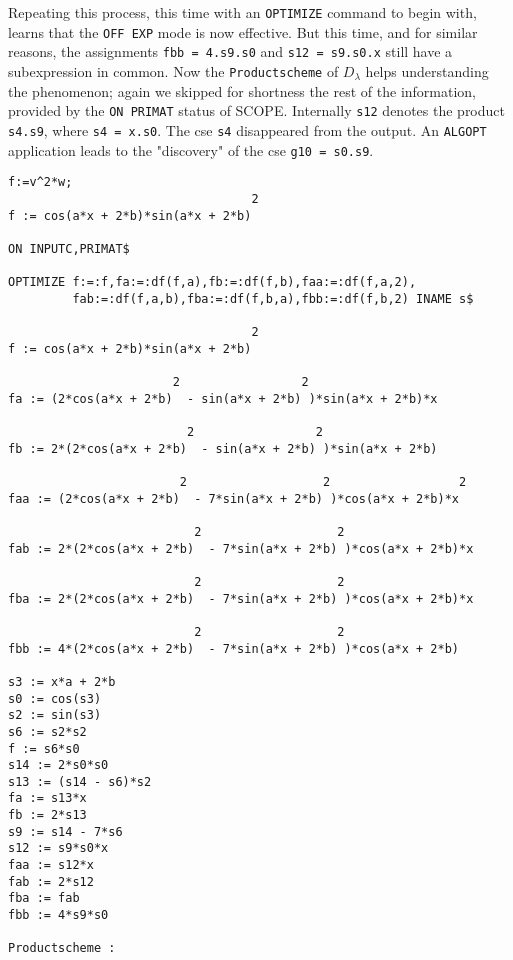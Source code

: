 Repeating this process, this time with an {\tt OPTIMIZE} command to begin with,
learns that the {\tt OFF EXP} mode is now effective. But this time, and for 
similar
reasons, the assignments {\tt fbb = 4.s9.s0} and {\tt s12 = s9.s0.x} still
have a subexpression in common. Now the \verb+Productscheme+ of $D_{\lambda}$ 
helps understanding the phenomenon; again we skipped for shortness the rest of
the information, provided by the {\tt ON PRIMAT} status of SCOPE.
Internally {\tt s12} denotes the product {\tt s4.s9},
where {\tt s4 = x.s0}. The cse {\tt s4} disappeared from the output. 
An {\tt ALGOPT} application leads to the "discovery" of the 
cse {\tt g10 = s0.s9}.
{\small
\begin{verbatim}
f:=v^2*w;
                                  2
f := cos(a*x + 2*b)*sin(a*x + 2*b)

ON INPUTC,PRIMAT$

OPTIMIZE f:=:f,fa:=:df(f,a),fb:=:df(f,b),faa:=:df(f,a,2),
         fab:=:df(f,a,b),fba:=:df(f,b,a),fbb:=:df(f,b,2) INAME s$

                                  2
f := cos(a*x + 2*b)*sin(a*x + 2*b)

                       2                 2
fa := (2*cos(a*x + 2*b)  - sin(a*x + 2*b) )*sin(a*x + 2*b)*x

                         2                 2
fb := 2*(2*cos(a*x + 2*b)  - sin(a*x + 2*b) )*sin(a*x + 2*b)

                        2                   2                  2
faa := (2*cos(a*x + 2*b)  - 7*sin(a*x + 2*b) )*cos(a*x + 2*b)*x

                          2                   2
fab := 2*(2*cos(a*x + 2*b)  - 7*sin(a*x + 2*b) )*cos(a*x + 2*b)*x

                          2                   2
fba := 2*(2*cos(a*x + 2*b)  - 7*sin(a*x + 2*b) )*cos(a*x + 2*b)*x

                          2                   2
fbb := 4*(2*cos(a*x + 2*b)  - 7*sin(a*x + 2*b) )*cos(a*x + 2*b)

s3 := x*a + 2*b
s0 := cos(s3)
s2 := sin(s3)
s6 := s2*s2
f := s6*s0
s14 := 2*s0*s0
s13 := (s14 - s6)*s2
fa := s13*x
fb := 2*s13
s9 := s14 - 7*s6
s12 := s9*s0*x
faa := s12*x
fab := 2*s12
fba := fab
fbb := 4*s9*s0

Productscheme :


\end{verbatim}}
